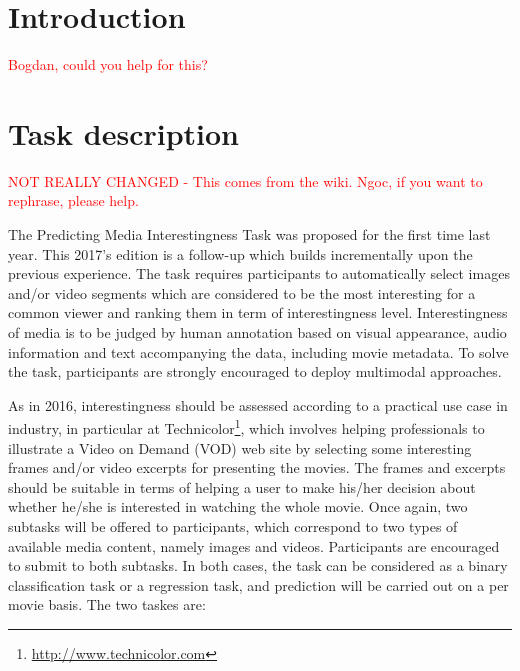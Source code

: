 \documentclass[sigconf]{acmart-me}
\begin{document}
\maketitle


\section{Introduction}

\textcolor{red}{Bogdan, could you help for this?}

\section{Task description}
\textcolor{red}{NOT REALLY CHANGED - This comes from the wiki. Ngoc, if you want to rephrase, please help.}

The Predicting Media Interestingness Task was proposed for the first time last year. This 2017's edition is a follow-up which builds incrementally upon the previous experience. The task requires participants to automatically select images and/or video segments which are considered to be the most interesting for a common viewer and ranking them in term of interestingness level. Interestingness of media is to be judged by human annotation based on visual appearance, audio information and text accompanying the data, including movie metadata. To solve the task, participants are strongly encouraged to deploy multimodal approaches.

As in 2016, interestingness should be assessed according to a practical use case in industry, in particular at Technicolor\footnote{\url{http://www.technicolor.com}}, which involves helping professionals to illustrate a Video on Demand (VOD) web site by selecting some interesting frames and/or video excerpts for presenting the movies. The frames and excerpts should be suitable in terms of helping a user to make his/her decision about whether he/she is interested in watching the whole movie.
Once again, two subtasks will be offered to participants, which correspond to two types of available media content, namely images and videos. Participants are encouraged to submit to both subtasks. In both cases, the task can be considered as a binary classification task or a regression task, and prediction will be carried out on a per movie basis.
The two taskes are:
\end{document}
